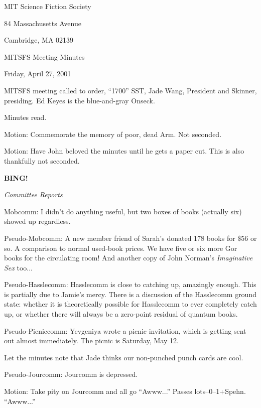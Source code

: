 \documentclass[12pt]{article}
\newcommand{\bing}{{\bf BING!} }
\newcommand{\goto}[1]{\bing \vskip 12pt \centerline{{\em{#1}}}}
\begin{document}
\begin{center}

MIT Science Fiction Society 

84 Massachusetts Avenue

Cambridge, MA 02139

\vspace{12pt}

MITSFS Meeting Minutes 

Friday, April 27, 2001

\end{center}
 
\vspace{18pt}

\setlength{\parskip}{6pt}

\noindent
MITSFS meeting called to order, ``1700'' SST, Jade Wang, President and
Skinner, presiding.  Ed Keyes is the blue-and-gray Onseck.

Minutes read.

Motion: Commemorate the memory of poor, dead Arm.  Not seconded.

Motion: Have John beloved the minutes until he gets a paper cut.
This is also thankfully not seconded.

\goto{Committee Reports}

Mobcomm: I didn't do anything useful, but two boxes of books (actually
six) showed up regardless.

Pseudo-Mobcomm: A new member friend of Sarah's donated 178 books for
\$56 or so.  A comparison to normal used-book prices.  We have five
or six more Gor books for the circulating room!  And another copy
of John Norman's {\em Imaginative Sex} too...

Pseudo-Hasslecomm: Hasslecomm is close to catching up, amazingly
enough.  This is partially due to Jamie's mercy.  There is a discussion
of the Hasslecomm ground state: whether it is theoretically possible
for Hasslecomm to ever completely catch up, or whether there will
always be a zero-point residual of quantum books.

Pseudo-Picniccomm: Yevgeniya wrote a picnic invitation, which is getting
sent out almost immediately.  The picnic is Saturday, May 12.

Let the minutes note that Jade thinks our non-punched punch cards
are cool.

Pseudo-Jourcomm: Jourcomm is depressed.

Motion: Take pity on Jourcomm and all go ``Awww...''  Passes
lots--0--1+Spehn.  ``Awww...''
\end{document}
